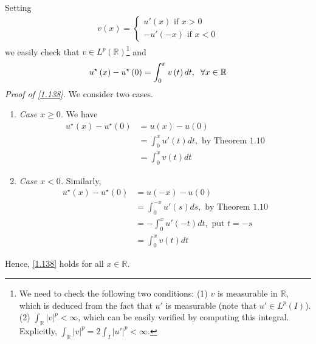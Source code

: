 \documentclass[a4paper,oneside]{article}
\numberwithin{equation}{section}
\begin{document}
Setting
\begin{align}
v\left( x \right) = \left\{ {\begin{array}{*{20}{c}}
{u'\left( x \right)\mbox{ if } x > 0}\\
{ - u'\left( { - x} \right)\mbox{ if } x < 0}
\end{array}} \right.
\end{align}
we easily check that $v\in L^p\left(\mathbb{R}\right)$\footnote{We need to check the following two conditions: (1) $v$ is measurable in $\mathbb{R}$, which is deduced from the fact that $u'$ is measurable (note that $u'\in L^p\left(I\right)$). (2) $\int_{\mathbb{R}} {{{\left| v \right|}^p}}  < \infty $, which can be easily verified by computing this integral. Explicitly, $\int_{\mathbb{R}} {{{\left| v \right|}^p}}  = 2\int_I {{{\left| {u'} \right|}^p}}  < \infty $.} and
\begin{align}
\label{1.138}
u^{\star}\left( x \right) - u^{\star} \left( 0 \right) = \int_0^x {v\left( t \right)dt} ,\hspace{0.2cm}\forall x \in \mathbb{R}
\end{align}
\textit{Proof of \eqref{1.138}.} We consider two cases.
\begin{enumerate}
\item \textit{Case $x\ge 0$.} We have
\begin{align}
u^{\star}\left( x \right) - u^{\star}\left( 0 \right) &= u\left( x \right) - u\left( 0 \right)\\
&= \int_0^x {u'\left( t \right)dt} ,\mbox{ by Theorem 1.10}\\
 &= \int_0^x {v\left( t \right)dt} 
\end{align}
\item \textit{Case $x<0$.} Similarly,
\begin{align}
u^{\star}\left( x \right) - u^{\star}\left( 0 \right) &= u\left( { - x} \right) - u\left( 0 \right)\\
 &= \int_0^{ - x} {u'\left( s \right)ds} ,\mbox{ by Theorem 1.10}\\
 &=  - \int_0^x {u'\left( { - t} \right)dt} ,\mbox{ put } t =  - s\\
 &= \int_0^x {v\left( t \right)dt} 
\end{align}
\end{enumerate}
Hence, \eqref{1.138} holds for all $x\in \mathbb{R}$. 
\end{document}
